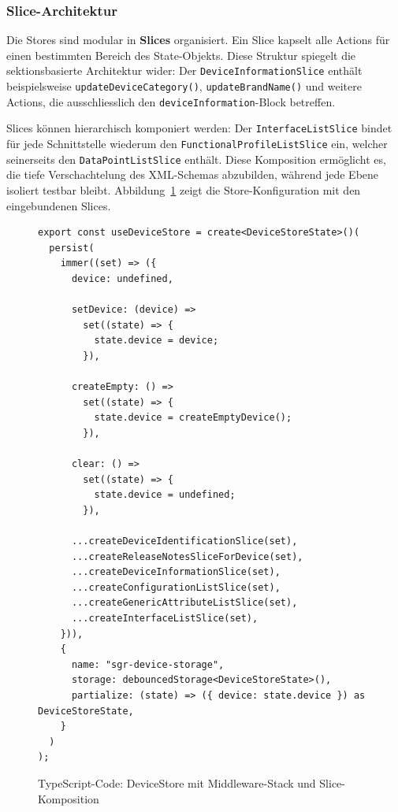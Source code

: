 \documentclass[a4paper,12pt]{article}
\newcommand{\code}[1]{\texttt{#1}}
\begin{document}
\subsubsection{Slice-Architektur}

Die Stores sind modular in \textbf{Slices} organisiert. Ein Slice kapselt alle Actions für einen bestimmten 
Bereich des State-Objekts. Diese Struktur spiegelt die sektionsbasierte Architektur wider: Der 
\code{DeviceInformationSlice} enthält beispielsweise \code{updateDeviceCategory()}, \code{updateBrandName()} 
und weitere Actions, die ausschliesslich den \code{deviceInformation}-Block betreffen.

Slices können hierarchisch komponiert werden: Der \code{InterfaceListSlice} bindet für jede Schnittstelle 
wiederum den \code{FunctionalProfileListSlice} ein, welcher seinerseits den \code{DataPointListSlice} 
enthält. Diese Komposition ermöglicht es, die tiefe Verschachtelung des XML-Schemas abzubilden, während 
jede Ebene isoliert testbar bleibt. Abbildung~\ref{fig:device-store} zeigt die Store-Konfiguration mit den 
eingebundenen Slices.

\begin{figure}[H]
    \centering
    \begin{lstlisting}[language=typescriptselective,frame=single,backgroundcolor=\color{gray!10},basicstyle=\ttfamily\scriptsize,breaklines=true]
export const useDeviceStore = create<DeviceStoreState>()(
  persist(
    immer((set) => ({
      device: undefined,

      setDevice: (device) =>
        set((state) => {
          state.device = device;
        }),

      createEmpty: () =>
        set((state) => {
          state.device = createEmptyDevice();
        }),

      clear: () =>
        set((state) => {
          state.device = undefined;
        }),

      ...createDeviceIdentificationSlice(set),
      ...createReleaseNotesSliceForDevice(set),
      ...createDeviceInformationSlice(set),
      ...createConfigurationListSlice(set),
      ...createGenericAttributeListSlice(set),
      ...createInterfaceListSlice(set),
    })),
    {
      name: "sgr-device-storage",
      storage: debouncedStorage<DeviceStoreState>(),
      partialize: (state) => ({ device: state.device }) as DeviceStoreState,
    }
  )
);
    \end{lstlisting}
    \caption{TypeScript-Code: DeviceStore mit Middleware-Stack und Slice-Komposition}
    \label{fig:device-store}
\end{figure}
\end{document}
